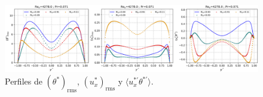\begin{figure}[H]
  \centering
    \includegraphics[width=\textwidth]{figures/apendices/developed/Re4278-Pr0071_merged_phif-uxf-uxphif.png}
  \caption{Perfiles de  $( \theta^*)_{\text{rms}}$,  $(u^*_x)_{\text{rms}}$ y  $\langle u^{* \prime}_x \theta^{* \prime} \rangle$.}
  \label{fig:profs-Re4278-Pr0071}
\end{figure}